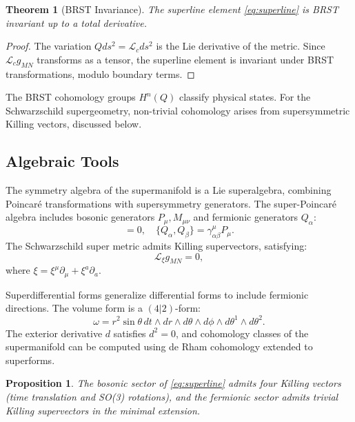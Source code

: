 \documentclass{article}
\theoremstyle{plain}
\newtheorem{theorem}{Theorem}
\newtheorem{proposition}{Proposition}
\newcommand{\superline}{ds^{2}}
\newcommand{\lie}[1]{\mathcal{L}_{#1}}
\begin{document}
\begin{theorem}[BRST Invariance]
The superline element \eqref{eq:superline} is BRST invariant up to a total derivative.
\end{theorem}

\begin{proof}
The variation $Q \superline = \lie{c} \superline$ is the Lie derivative of the metric. Since $\lie{c} g_{MN}$ transforms as a tensor, the superline element is invariant under BRST transformations, modulo boundary terms.
\end{proof}

The BRST cohomology groups $H^{n}(Q)$ classify physical states. For the Schwarzschild supergeometry, non-trivial cohomology arises from supersymmetric Killing vectors, discussed below.

\subsection{Algebraic Tools}

The symmetry algebra of the supermanifold is a Lie superalgebra, combining Poincaré transformations with supersymmetry generators. The super-Poincaré algebra includes bosonic generators $P_{\mu}, M_{\mu\nu}$ and fermionic generators $Q_{\alpha}$:
\begin{equation}
[P_{\mu}, Q_{\alpha}] = 0, \quad \{ Q_{\alpha}, Q_{\beta} \} = \gamma^{\mu}_{\alpha\beta} P_{\mu}.
\end{equation}
The Schwarzschild super metric admits Killing supervectors, satisfying:
\begin{equation}
\lie{\xi} g_{MN} = 0,
\end{equation}
where $\xi = \xi^{\mu} \partial_{\mu} + \xi^{a} \partial_{a}$.

Superdifferential forms generalize differential forms to include fermionic directions. The volume form is a $(4|2)$-form:
\begin{equation}
\omega = r^{2} \sin\theta \, dt \wedge dr \wedge d\theta \wedge d\phi \wedge d\theta^{1} \wedge d\theta^{2}.
\end{equation}
The exterior derivative $d$ satisfies $d^{2} = 0$, and cohomology classes of the supermanifold can be computed using de Rham cohomology extended to superforms.

\begin{proposition}
The bosonic sector of \eqref{eq:superline} admits four Killing vectors (time translation and SO(3) rotations), and the fermionic sector admits trivial Killing supervectors in the minimal extension.
\end{proposition}
\end{document}
